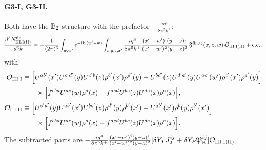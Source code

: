 \paragraph*{G3-I, G3-II.} Both have the $\mathbb{B}_2$ structure with the prefactor $-\frac{ig^4}{8\pi^5k^+}$:
\begin{equation}
\frac{d^3N^{\rm fin}_{\rm III.I(II)}}{d^3k}=-\frac{1}{(2\pi)^3}\int_{w,w'}e^{-ik\cdot(w'-w)}\int_{x,y,z,x'}\frac{ig^4}{8\pi^5k^+}\frac{(x'-w')^i(y-z)^j}{(x'-w')^2(y-z)^2}\,\mathfrak F^{{\rm fin},ij}(x,z,w)\,\mathcal{O}_{\rm III.I(II)}+{\rm c.c.},
\end{equation}
with
\begin{align}
\mathcal{O}_{\rm III.I}&\equiv\Big[U^{ab'}(x')U^{c'd'}(y)U^{c'b}(z)\rho^{b'}(x')\rho^{d'}(y)-U^{bd'}(z)U^{d'e'}(y)U^{ac'}(w')\rho^{c'}(x')\rho^{e'}(y)\Big]\notag\\
&\qquad\times\Big[f^{cbd}U^{ac}(w)\rho^d(x)-f^{acd}U^{bc}(z)U^{de}(x)\rho^e(x)\Big],\notag\\
\mathcal{O}_{\rm III.II}&\equiv\Big[U^{c'd'}(y)U^{ab'}(x')U^{bc'}(z)\rho^{d'}(y)\rho^{b'}(x')-U^{ab'}(x')\rho^b(y)\rho^{b'}(x')\Big]\notag\\
&\qquad\times\Big[f^{cbd}U^{ac}(w)\rho^d(x)-f^{acd}U^{bc}(z)U^{de}(x)\rho^e(x)\Big].
\end{align}
The subtracted parts are $-\frac{ig^4}{8\pi^5k^+}\frac{(x'-w')^i(y-z)^j}{(x'-w')^2(y-z)^2}[\delta Y_TJ_2^{ij}+\delta Y_P\mathfrak P_{\mathbb{B}}^{ij}]\mathcal{O}_{\rm III.I(II)}$.

